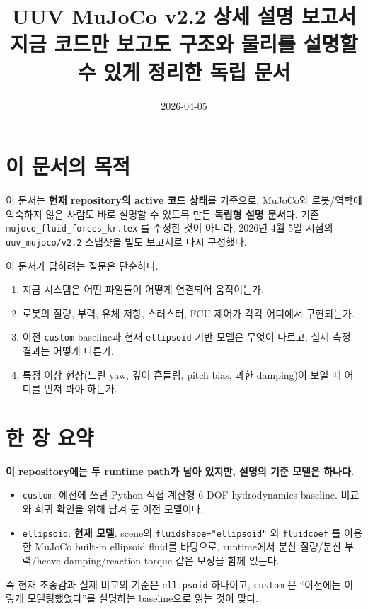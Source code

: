 \documentclass[11pt,a4paper]{article}
\title{UUV MuJoCo v2.2 상세 설명 보고서\\
\large 지금 코드만 보고도 구조와 물리를 설명할 수 있게 정리한 독립 문서}
\author{}
\date{2026-04-05}
\newcommand{\code}[1]{\nolinkurl{#1}}
\begin{document}
\maketitle
\tableofcontents
\clearpage

\section{이 문서의 목적}

이 문서는 \textbf{현재 repository의 active 코드 상태}를 기준으로, MuJoCo와 로봇/역학에 익숙하지 않은 사람도 바로 설명할 수 있도록 만든 \textbf{독립형 설명 문서}다. 기존 \code{mujoco\_fluid\_forces\_kr.tex} 를 수정한 것이 아니라, 2026년 4월 5일 시점의 \code{uuv\_mujoco/v2.2} 스냅샷을 별도 보고서로 다시 구성했다.

이 문서가 답하려는 질문은 단순하다.

\begin{enumerate}[leftmargin=2em]
  \item 지금 시스템은 어떤 파일들이 어떻게 연결되어 움직이는가.
  \item 로봇의 질량, 부력, 유체 저항, 스러스터, FCU 제어가 각각 어디에서 구현되는가.
  \item 이전 \code{custom} baseline과 현재 \code{ellipsoid} 기반 모델은 무엇이 다르고, 실제 측정 결과는 어떻게 다른가.
  \item 특정 이상 현상(느린 yaw, 깊이 흔들림, pitch bias, 과한 damping)이 보일 때 어디를 먼저 봐야 하는가.
\end{enumerate}

\section{한 장 요약}

\textbf{이 repository에는 두 runtime path가 남아 있지만, 설명의 기준 모델은 하나다.}

\begin{itemize}[leftmargin=2em]
  \item \code{custom}: 예전에 쓰던 Python 직접 계산형 6-DOF hydrodynamics baseline. 비교와 회귀 확인을 위해 남겨 둔 이전 모델이다.
  \item \code{ellipsoid}: \textbf{현재 모델}. scene의 \code{fluidshape="ellipsoid"} 와 \code{fluidcoef} 를 이용한 MuJoCo built-in ellipsoid fluid를 바탕으로, runtime에서 분산 질량/분산 부력/heave damping/reaction torque 같은 보정을 함께 얹는다.
\end{itemize}

즉 현재 조종감과 실제 비교의 기준은 \code{ellipsoid} 하나이고, \code{custom} 은 ``이전에는 이렇게 모델링했었다''를 설명하는 baseline으로 읽는 것이 맞다.
\end{document}
